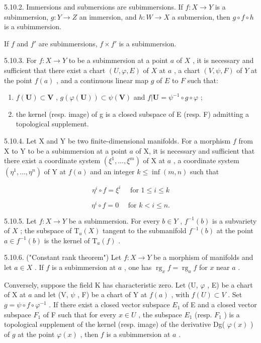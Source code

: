 5.10.2. Immersions and submersions are subimmersions. If \(f: X \to Y\) is a subimmersion, \(g: Y \to Z\) an immersion, and \(h: W \to X\) a submersion, then \(g \circ f \circ h\) is a subimmersion.

If \(f\) and \(f'\) are subimmersions, \(f \times f'\) is a subimmersion.

5.10.3. For \(f: X \to Y\) to be a subimmersion at a point \(a\) of \(X\) , it is necessary and sufficient that there exist a chart \((U, \varphi, E)\) of \(X\) at \(a\) , a chart \((V, \psi, F)\) of \(Y\) at the point \(f(a)\) , and a continuous linear map \(g\) of \(E\) to \(F\) such that:

\begin{enumerate}
\def\labelenumi{(\roman{enumi})}
\item
  \(f(\mathbf{U}) \subset \mathbf{V}\) , \(g(\varphi(\mathbf{U})) \subset \psi(\mathbf{V})\) and \(f|\mathbf{U} = \psi^{-1} \circ g \circ \varphi\) ;
\item
  the kernel (resp. image) of g is a closed subspace of E (resp. F) admitting a topological supplement.
\end{enumerate}

5.10.4. Let X and Y be two finite-dimensional manifolds. For a morphism \(f\) from X to Y to be a subimmersion at a point \(a\) of X, it is necessary and sufficient that there exist a coordinate system \((\xi^{1},\ldots,\xi^{m})\) of X at \(a\) , a coordinate system \((\eta^{1},\ldots,\eta^{n})\) of Y at \(f(a)\) and an integer \(k\leqslant\inf(m,n)\) such that

\[
\eta^ {i} \circ f = \xi^ {i} \quad \text { for } 1 \leqslant i \leqslant k
\]

\[
\eta^ {i} \circ f = 0 \quad \text {   for   } k <   i \leqslant n.
\]

5.10.5. Let \(f: X \to Y\) be a subimmersion. For every \(b \in Y\) , \(f^{-1}(b)\) is a subvariety of \(X\) ; the subspace of \(\mathrm{T}_{a}(X)\) tangent to the submanifold \(f^{-1}(b)\) at the point \(a \in f^{-1}(b)\) is the kernel of \(\mathrm{T}_{a}(f)\) .

5.10.6. ("Constant rank theorem") Let \(f: X \to Y\) be a morphism of manifolds and let \(a \in X\) . If \(f\) is a subimmersion at \(a\) , one has \(\operatorname{rg}_{x} f = \operatorname{rg}_{a} f\) for \(x\) near \(a\) .

Conversely, suppose the field K has characteristic zero. Let (U, \(\varphi\) , E) be a chart of X at \(a\) and let (V, \(\psi\) , F) be a chart of Y at \(f(a)\) , with \(f(U) \subset V\) . Set \(g = \psi \circ f \circ \varphi^{-1}\) . If there exist a closed vector subspace \(E_{1}\) of E and a closed vector subspace \(F_{1}\) of F such that for every \(x \in U\) , the subspace \(E_{1}\) (resp. \(F_{1}\) ) is a topological supplement of the kernel (resp. image) of the derivative Dg( \(\varphi(x)\) ) of \(g\) at the point \(\varphi(x)\) , then \(f\) is a subimmersion at \(a\) .

